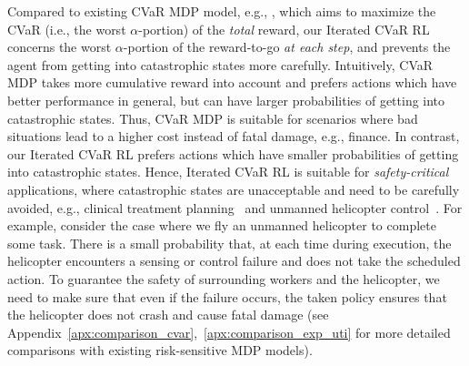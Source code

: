 \documentclass{article} %
\newcommand{\revision}[1]{{\color{black} #1}}
\newcommand{\yihan}[1]{}
\newcommand{\yihan}[1]{{\color{teal} [\text{Yihan:} #1]}}
\begin{document}
	\revision{
		Compared to existing CVaR MDP model, e.g., \citep{boda2006time,ott2010markov,bauerle2011markov,chow2015risk},\yihan{added ``e.g.,'' for the references of CVaR MDP} which aims to maximize the CVaR (i.e., the worst $\alpha$-portion) of the \emph{total} reward, our Iterated CVaR RL concerns the worst $\alpha$-portion of the reward-to-go \emph{at each step}, and prevents the agent from getting into catastrophic states more carefully. Intuitively, CVaR MDP takes more cumulative reward into account\yihan{changed ``overall performance'' to ``cumulative reward''} and prefers actions which have better performance in general, but can have larger probabilities of getting into catastrophic states. Thus, CVaR MDP is suitable for scenarios where bad situations lead to a higher cost instead of fatal damage, e.g., finance.
		In contrast, our Iterated CVaR RL prefers actions which have smaller probabilities of getting into catastrophic states. 
		Hence, Iterated CVaR RL is suitable for \emph{safety-critical} applications, where catastrophic states are unacceptable and need to be carefully avoided, e.g., clinical treatment planning~\citep{wang2019artificial} and unmanned helicopter control~\citep{unmanned_helicopter}.
		For example, consider the case where 
		we fly an unmanned helicopter to complete some task. There is a small probability that, at each time during execution, the helicopter encounters a sensing or control failure and does not take the scheduled action. 
		To guarantee the safety of surrounding workers and the helicopter, we need to make sure that even if 
		the failure occurs, the taken policy ensures that the helicopter does not crash and cause fatal damage  (see Appendix~\ref{apx:comparison_cvar},~\ref{apx:comparison_exp_uti} for more detailed comparisons with existing risk-sensitive MDP models).
	}
	
\end{document}
